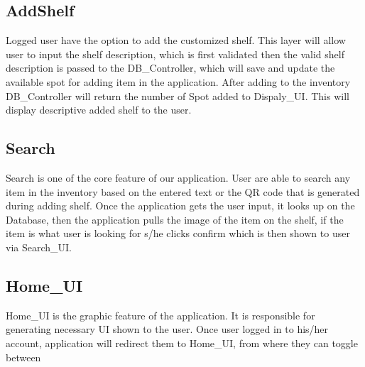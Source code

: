 \subsection{AddShelf}
Logged user have the option to add the customized shelf. This layer will allow user to input the shelf description, which is first validated then the valid shelf description is passed to the DB\_Controller, which will save and update the available spot for adding item in the application. After adding to the inventory DB\_Controller will return the number of Spot added to Dispaly\_UI. This will display descriptive added shelf to the user.

\subsection{Search}
Search is one of the core feature of our application. User are able to search any item in the inventory based on the entered text or the QR code that is generated during adding shelf. Once the application gets the user input, it looks up on the Database, then the application pulls the image of the item on the shelf, if the item is what user is looking for s/he clicks confirm which is then shown to user via Search\_UI.

\subsection{Home\_UI}
Home\_UI is the graphic feature of the application. It is responsible for generating necessary UI shown to the user. Once user logged in to his/her account, application will redirect them to Home\_UI, from where they can toggle between 